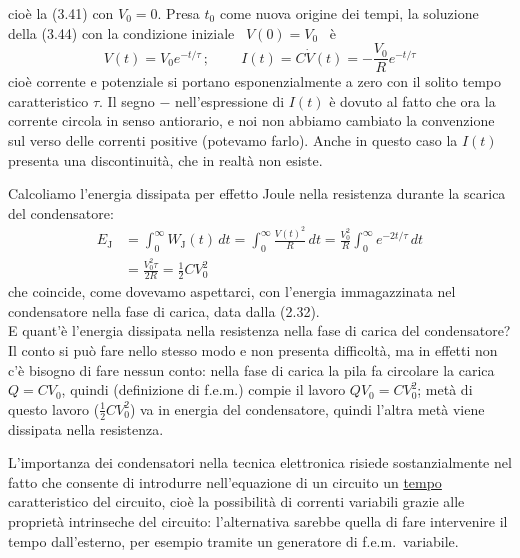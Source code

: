 cio\`e la (3.41) con $V_0=0$. Presa $t_0$ come nuova origine dei tempi, la
soluzione della (3.44) con la condizione iniziale \ $V(0)=V_0$ \ \`e
\begin{equation}
  V(t)=V_0e^{-t/\tau}\,;\qquad\ I(t)=C\dot V(t)=-\frac{V_0}{R}e^{-t/\tau}
  \tag{3.45}
\end{equation}
cio\`e corrente e potenziale si portano esponenzialmente a zero con il solito
tempo caratteristico $\tau$. Il segno $-$ nell'espressione di $I(t)$ \`e dovuto
al fatto che ora la corrente circola in senso antiorario, e noi non abbiamo
cambiato la convenzione sul verso delle correnti positive (potevamo farlo).
Anche in questo caso la $I(t)$ presenta una discontinuit\`a, che in realt\`a non
esiste.

Calcoliamo l'energia dissipata per effetto Joule nella resistenza durante la
scarica del condensatore:
\begin{equation}
  \begin{split}
    E_\mathrm J&=\int_0^\infty W_\mathrm J(t)\,dt
    =\int_0^\infty\frac{V(t)^2}{R}\,dt
    =\frac{V_0^2}{R}\int_0^\infty e^{-2t/\tau}\,dt\\
    &=\frac{V_0^2\tau}{2R}=\frac12CV_0^2
  \end{split}
  \tag{3.46}
\end{equation}
che coincide, come dovevamo aspettarci, con l'energia immagazzinata nel
condensatore nella fase di carica, data dalla (2.32).\\
E quant'\`e l'energia dissipata nella resistenza nella fase di carica del
condensatore? Il conto si pu\`o fare nello stesso modo e non presenta
difficolt\`a, ma in effetti non c'\`e bisogno di fare nessun conto: nella fase
di carica la pila fa circolare la carica $Q=CV_0$, quindi (definizione di
f.e.m.) compie il lavoro $QV_0=CV_0^2$; met\`a di questo lavoro
($\frac12CV_0^2$) va in energia del condensatore, quindi l'altra met\`a viene
dissipata nella resistenza.

L'importanza dei condensatori nella tecnica elettronica risiede sostanzialmente
nel fatto che consente di introdurre nell'equazione di un circuito un
\underline{tempo} caratteristico del circuito, cio\`e la possibilit\`a di
correnti variabili grazie alle propriet\`a intrinseche del circuito:
l'alternativa sarebbe quella di fare intervenire il tempo dall'esterno, per
esempio tramite un generatore di f.e.m.\ variabile.

